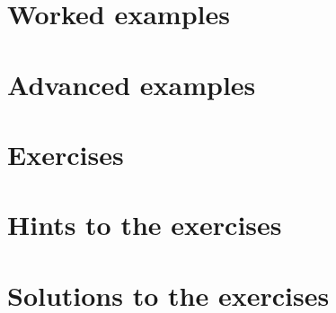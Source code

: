 \section{Worked examples}


\section{Advanced examples}


\section{Exercises}


\ifdefined\IncludeExerciseHints
\section*{Hints to the exercises}

\fi

\ifdefined\IncludeExerciseSolutions
\section*{Solutions to the exercises}

\fi

